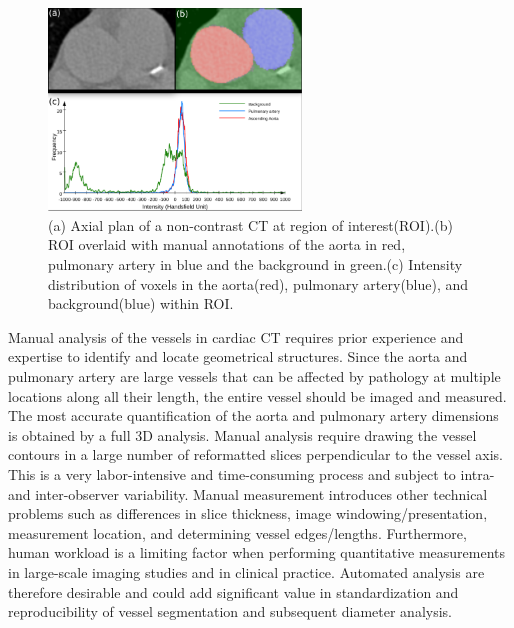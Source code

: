 \begin{figure}[hbt]
    \centering
    \includegraphics[width=0.60\textwidth]{Figures/vol13_intensityDistribution_2.png}
    \caption{(a) Axial plan of a non-contrast \gls{CT} at region of interest(ROI).(b) ROI overlaid with manual annotations of the aorta in red, pulmonary artery in blue and the background in green.(c) Intensity distribution of voxels in the aorta(red), pulmonary artery(blue), and background(blue) within ROI.}\label{fig: Intensity_Distribution}
\end{figure} 

Manual analysis of the vessels in cardiac CT requires prior experience and expertise to identify and locate geometrical structures. Since the aorta and pulmonary artery are large vessels that can be affected by pathology at multiple locations along all their length, the entire vessel should be imaged and measured. The most accurate quantification of the aorta and pulmonary artery dimensions is obtained by a full 3D analysis. Manual analysis require drawing the vessel contours in a large number of reformatted slices perpendicular to the vessel axis. This is a very labor-intensive and time-consuming process and subject to intra- and inter-observer variability. Manual measurement introduces other technical problems such as differences in slice thickness, image windowing/presentation, measurement location, and determining vessel edges/lengths. Furthermore, human workload is a limiting factor when performing quantitative measurements in large-scale imaging studies and in clinical practice. Automated analysis are therefore desirable and could add significant value in standardization and reproducibility of vessel segmentation and subsequent diameter analysis.

